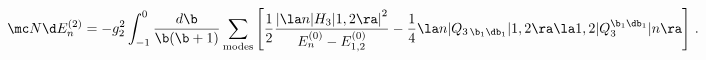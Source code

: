 \begin{equation}\label{de2}
{\mc N}\d E_n^{(2)}=-g_2^2\int_{-1}^0\frac{d\b}{\b(\b+1)}
\sum_{\text{modes}}\left[
\frac{1}{2}\frac{\left|\la n|H_3|1,2\ra\right|^2}{E_n^{(0)}-E_{1,2}^{(0)}}
-\frac{1}{4}\la n|Q_{3\,\b_1\db_1}|1,2\ra\la 1,2|Q_3^{\b_1\db_1}|n\ra\right]\,.
\end{equation}


